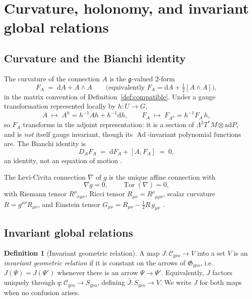 \documentclass[11pt,a4paper]{article}
\theoremstyle{plain}
\theoremstyle{definition}
\newtheorem{definition}[theorem]{Definition}
\theoremstyle{remark}
\newcommand{\gfrak}{\mathfrak{g}}
\newcommand{\Ggeo}{\mathfrak{G}_{\mathrm{geo}}}
\newcommand{\Cgeo}{\mathcal{C}_{\mathrm{geo}}}
\newcommand{\Sgeo}{S_{\mathrm{geo}}}
\newcommand{\Ad}{\operatorname{Ad}}
\newcommand{\Tor}{\operatorname{Tor}}
\begin{document}
\section{Curvature, holonomy, and invariant global relations}
\label{sec:invariants}

\subsection{Curvature and the Bianchi identity}

The curvature of the connection $A$ is the $\gfrak$-valued $2$-form
\begin{equation}
\label{eq:curv}
F_A \;=\; \mathrm{d}A + A\wedge A
\qquad
\bigl(\text{equivalently } F_A=\mathrm{d}A+\tfrac12[A\wedge A]\bigr),
\end{equation}
in the matrix convention of Definition~\ref{def:compatible}. Under a gauge transformation
represented locally by $h\colon U\to G$,
\begin{equation}
\label{eq:gauge-transf}
A \;\longmapsto\; A^{h}=h^{-1}Ah+h^{-1}\mathrm{d}h,
\qquad
F_A \;\longmapsto\; F_{A^h}=h^{-1}F_A\,h ,
\end{equation}
so $F_A$ transforms in the adjoint representation: it is a section of
$\Lambda^2T^*M\otimes \mathrm{ad}P$, and is \emph{not} itself gauge invariant, though its
$\Ad$-invariant polynomial functions are. The Bianchi identity is
\begin{equation}
\label{eq:bianchi}
D_A F_A \;=\; \mathrm{d}F_A + [A,F_A] \;=\;0 ,
\end{equation}
an identity, not an equation of motion \cite{KobayashiNomizu1}.

The Levi-Civita connection $\nabla$ of $g$ is the unique affine connection with
\begin{equation}
\label{eq:LC}
\nabla g=0,
\qquad
\Tor(\nabla)=0 ,
\end{equation}
with Riemann tensor $R^{\rho}{}_{\sigma\mu\nu}$, Ricci tensor $R_{\mu\nu}=R^{\rho}{}_{\mu\rho\nu}$,
scalar curvature $R=g^{\mu\nu}R_{\mu\nu}$, and Einstein tensor
$G_{\mu\nu}=R_{\mu\nu}-\tfrac12 R\,g_{\mu\nu}$ \cite{Wald}.

\subsection{Invariant global relations}

\begin{definition}[Invariant geometric relation]
\label{def:invariant-relation}
A map $J\colon\Cgeo\to V$ into a set $V$ is an \emph{invariant geometric relation} if it is
constant on the arrows of $\Ggeo$, i.e.\ $J(\Psi)=J(\Psi')$ whenever there is an arrow
$\Psi\to\Psi'$. Equivalently, $J$ factors uniquely through $q\colon\Cgeo\to\Sgeo$, defining
$\bar J\colon\Sgeo\to V$. We write $J$ for both maps when no confusion arises.
\end{definition}
\end{document}
